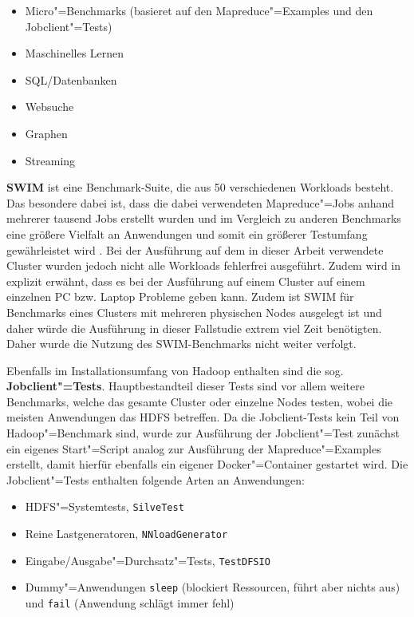 \begin{itemize}
    \item Micro"=Benchmarks (basieret auf den Mapreduce"=Examples und den Jobclient"=Tests)
    \item Maschinelles Lernen
    \item SQL/Datenbanken
    \item Websuche
    \item Graphen
    \item Streaming
\end{itemize}

\textbf{\ac{SWIM}} ist eine Benchmark-Suite, die aus 50 verschiedenen Workloads besteht. Das besondere dabei ist, dass die dabei verwendeten Mapreduce"=Jobs anhand mehrerer tausend Jobs erstellt wurden und im Vergleich zu anderen Benchmarks eine größere Vielfalt an Anwendungen und somit ein größerer Testumfang gewährleistet wird \cite{SwimWikiHome}. Bei der Ausführung auf dem in dieser Arbeit verwendete Cluster wurden jedoch nicht alle Workloads fehlerfrei ausgeführt. Zudem wird in \cite{InriaTutorial} explizit erwähnt, dass es bei der Ausführung auf einem Cluster auf einem einzelnen PC bzw. Laptop Probleme geben kann. Zudem ist SWIM für Benchmarks eines Clusters mit mehreren physischen Nodes ausgelegt ist und daher würde die Ausführung in dieser Fallstudie extrem viel Zeit benötigten. Daher wurde die Nutzung des SWIM-Benchmarks nicht weiter verfolgt.

Ebenfalls im Installationsumfang von Hadoop enthalten sind die sog. \textbf{Jobclient"=Tests}. Hauptbestandteil dieser Tests sind vor allem weitere Benchmarks, welche das gesamte Cluster oder einzelne Nodes testen, wobei die meisten Anwendungen das \ac{HDFS} betreffen. Da die Jobclient-Tests kein Teil von Hadoop"=Benchmark sind, wurde zur Ausführung der Jobclient"=Test zunächst ein eigenes Start"=Script analog zur Ausführung der Mapreduce"=Examples erstellt, damit hierfür ebenfalls ein eigener Docker"=Container gestartet wird. Die Jobclient"=Tests enthalten \uA folgende Arten an Anwendungen:

\begin{itemize}
    \item \ac{HDFS}"=Systemtests, \zB \texttt{SilveTest}
    \item Reine Lastgeneratoren, \zB \texttt{NNloadGenerator}
    \item Eingabe/Ausgabe"=Durchsatz"=Tests, \zB \texttt{TestDFSIO}
    \item Dummy"=Anwendungen \texttt{sleep} (blockiert Ressourcen, führt aber nichts aus) und \texttt{fail} (Anwendung schlägt immer fehl)
\end{itemize}
